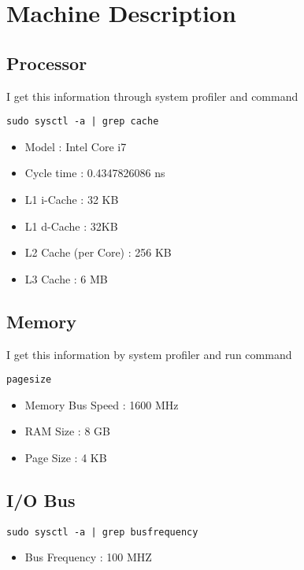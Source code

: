\chapter[Machine Description]{Machine Description}

\section{Processor}

I get this information through system profiler and command 
\begin{verbatim}
sudo sysctl -a | grep cache
\end{verbatim}

\begin{itemize}
\item Model : Intel Core i7
\item Cycle time : 0.4347826086 ns
\item L1 i-Cache : 32 KB
\item L1 d-Cache : 32KB
\item L2 Cache (per Core) : 256 KB
\item L3 Cache : 6 MB
\end{itemize}

\section{Memory}
I get this information by system profiler and run command
\begin{verbatim}
pagesize
\end{verbatim}

\begin{itemize}
\item Memory Bus Speed : 1600 MHz
\item RAM Size : 8 GB
\item Page Size : 4 KB
\end{itemize}

\section{I/O Bus}
\begin{verbatim}
sudo sysctl -a | grep busfrequency
\end{verbatim}

\begin{itemize}
\item Bus Frequency : 100 MHZ
\end{itemize}



